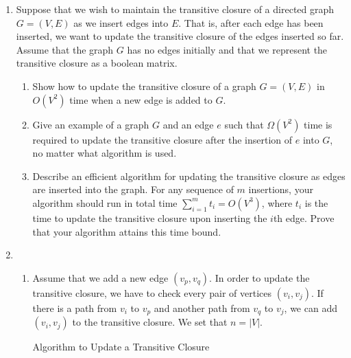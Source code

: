 \documentclass[12pt,a4paper]{article}
\makeatletter
\newtheorem*{solution}{Solution}
\theoremstyle{definition}
\renewenvironment{solution}[1][Solution] {\par\pushQED{\qed}\normalfont\topsep6\p@\@plus6\p@\relax\trivlist\item[\hskip\labelsep\bfseries#1\@addpunct{.}]\ignorespaces}{\popQED\endtrivlist\@endpefalse} \makeatother
\makeatother
\begin{document}
\begin{enumerate}
	\item Suppose that we wish to maintain the transitive closure of a directed graph $G=(V,E)$ as we insert edges into $E$. That is, after each edge has been inserted, we want to update the transitive closure of the edges inserted so far. Assume that the graph $G$ has no edges initially and that we represent the transitive closure as a boolean matrix.
	\begin{enumerate}
	    \item Show how to update the transitive closure of a graph $G=(V,E)$ in $O(V^2)$ time when a new edge is added to $G$.
	    \item Give an example of a graph $G$ and an edge $e$ such that $\Omega(V^2)$ time is required to update the transitive closure after the insertion of $e$ into $G$, no matter what algorithm is used.
	    \item Describe an efficient algorithm for updating the transitive closure as edges are inserted into the graph. For any sequence of $m$ insertions, your algorithm should run in total time $\sum_{i=1}^m t_i=O(V^3)$, where $t_i$ is the time to update the transitive closure upon inserting the $i$th edge. Prove that your algorithm attains this time bound.
	\end{enumerate}
	\begin{solution}
	~
	\begin{enumerate}
	    \item 
	    Assume that we add a new edge $(v_p,v_q)$. In order to update the transitive closure, we have to check every pair of vertices $(v_i,v_j)$. If there is a path from $v_i$ to $v_p$ and another path from $v_q$ to $v_j$, we can add $(v_i,v_j)$ to the transitive closure. We set that $n=|V|$.
	    
	    \begin{minipage}[t]{0.85\textwidth}
        \begin{algorithm}[H]
        
        \BlankLine
        \caption{Algorithm to Update a Transitive Closure}
        \label{Alg-closure}
            \end{algorithm}
        \end{minipage}
    

\end{enumerate}
\end{solution}
\end{enumerate}
\end{document}
